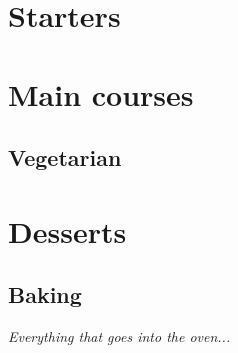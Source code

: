 \documentclass[11pt,paper=a4]{scrbook}
\begin{document}


\tableofcontents                        %


\part{Starters}

\part{Main courses}
\chapter{Vegetarian}


\part{Desserts}
\chapter{Baking}
\textit{Everything that goes into the oven...} %



\end{document}

